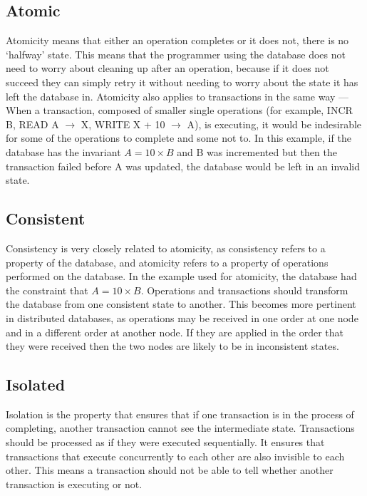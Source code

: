 \documentclass[12pt,twoside,notitlepage]{report}
\begin{document}
\subsection*{Atomic}

Atomicity means that either an operation completes or it does not, there is no `halfway' state.
This means that the programmer using the database does not need to worry about cleaning up after
an operation, because if it does not succeed they can simply retry it without needing to worry about
the state it has left the database in. Atomicity also applies to transactions in the same way ---
When a transaction, composed of smaller single operations (for example, INCR
B, READ A $\rightarrow$ X, WRITE X + 10 $\rightarrow$ A), is executing, it would be indesirable
for some of the operations to complete and some not to. In this example, if the database has the
invariant $A = 10\times B$ and B was incremented but then the transaction failed before A was
updated, the database would be left in an invalid state.

\subsection*{Consistent}

Consistency is very closely related to atomicity, as consistency refers to a property of the
database, and atomicity refers to a property of operations performed on the database. In the
example used for atomicity, the database had the constraint that $A = 10\times B$. Operations and
transactions should transform the database from one consistent state to another. This becomes more
pertinent in distributed databases, as operations may be received in one order at one node and in
a different order at another node. If they are applied in the order that they were received then
the two nodes are likely to be in inconsistent states.

\subsection*{Isolated}

Isolation is the property that ensures that if one transaction is in the process of completing,
another transaction cannot see the intermediate state. Transactions should be processed as if they
were executed sequentially. It ensures that transactions that execute concurrently to each other
are also invisible to each other. This means a transaction should not be able to tell whether
another transaction is executing or not.
\end{document}
